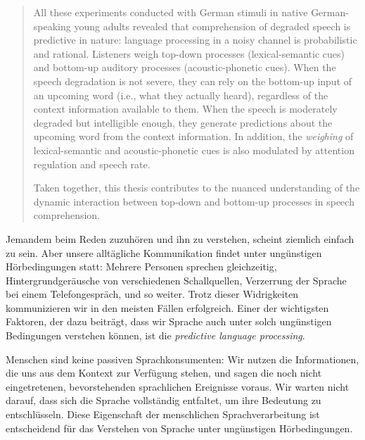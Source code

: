 \documentclass[a4paper, nobind]{templates/ociamthesis}
\begin{document}
\begin{romanpages}
\begin{abstract}
All these experiments conducted with German stimuli in native German-speaking young adults revealed that comprehension of degraded speech is predictive in nature:
language processing in a noisy channel is probabilistic and rational.
Listeners weigh top-down processes (lexical-semantic cues) and bottom-up auditory processes (acoustic-phonetic cues).
When the speech degradation is not severe, they can rely on the bottom-up input of an upcoming word (i.e., what they actually heard), regardless of the context information available to them.
When the speech is moderately degraded but intelligible enough, they generate predictions about the upcoming word from the context information.
In addition, the \emph{weighing} of lexical-semantic and acoustic-phonetic cues is also modulated by attention regulation and speech rate.

Taken together, this thesis contributes to the nuanced understanding of the dynamic interaction between top-down and bottom-up processes in speech comprehension.
\end{abstract}




\renewcommand{\abstractsecondtitle}{Zusammenfassung}
\begin{abstractsecond}
	Jemandem beim Reden zuzuhören und ihn zu verstehen, scheint ziemlich einfach zu sein.
Aber unsere alltägliche Kommunikation findet unter ungünstigen Hörbedingungen statt:
Mehrere Personen sprechen gleichzeitig,
Hintergrundgeräusche von verschiedenen Schallquellen,
Verzerrung der Sprache bei einem Telefongespräch, und so weiter.
Trotz dieser Widrigkeiten kommunizieren wir in den meisten Fällen erfolgreich.
Einer der wichtigsten Faktoren, der dazu beiträgt, dass wir Sprache auch unter solch ungünstigen Bedingungen verstehen können, ist die \emph{predictive language processing}.

Menschen sind keine passiven Sprachkonsumenten: Wir nutzen die Informationen, die uns aus dem Kontext zur Verfügung stehen, und sagen die noch nicht eingetretenen, bevorstehenden sprachlichen Ereignisse voraus.
Wir warten nicht darauf, dass sich die Sprache vollständig entfaltet, um ihre Bedeutung zu entschlüsseln.
Diese Eigenschaft der menschlichen Sprachverarbeitung ist entscheidend für das Verstehen von Sprache unter ungünstigen Hörbedingungen.


\end{abstractsecond}
\end{romanpages}
\end{document}
